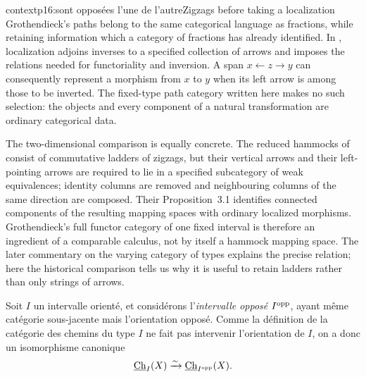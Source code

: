 \begin{dcomment}{context}{p16:sont opposées l'une de l'autre}{Zigzags before taking a localization}
Grothendieck's paths belong to the same categorical language as fractions, while retaining information which a category of fractions has already identified. In \citet[Chapter~I, \S1.1]{GabrielZisman1967}, localization adjoins inverses to a specified collection of arrows and imposes the relations needed for functoriality and inversion. A span $x\leftarrow z\to y$ can consequently represent a morphism from $x$ to $y$ when its left arrow is among those to be inverted. The fixed-type path category written here makes no such selection: the objects and every component of a natural transformation are ordinary categorical data.

The two-dimensional comparison is equally concrete. The reduced hammocks of \citet[Definition~2.1]{DwyerKan1980Calculating} consist of commutative ladders of zigzags, but their vertical arrows and their left-pointing arrows are required to lie in a specified subcategory of weak equivalences; identity columns are removed and neighbouring columns of the same direction are composed. Their Proposition~3.1 identifies connected components of the resulting mapping spaces with ordinary localized morphisms. Grothendieck's full functor category of one fixed interval is therefore an ingredient of a comparable calculus, not by itself a hammock mapping space. The later commentary on the varying category of types explains the precise relation; here the historical comparison tells us why it is useful to retain ladders rather than only strings of arrows.
\end{dcomment}


Soit $I$ un intervalle orienté, et considérons l'\textit{intervalle opposé $I^{\mathrm{opp}}$}, ayant même catégorie sous-jacente mais l'orientation opposé. Comme la définition de la catégorie des chemins du type $I$ ne fait pas intervenir l'orientation de $I$, on a donc un isomorphisme canonique %
\[
\underline{\mathrm{Ch}}_I(X) \xrightarrow{\sim} \underline{\mathrm{Ch}}_{I^{\mathrm{opp}}}(X).
\]


